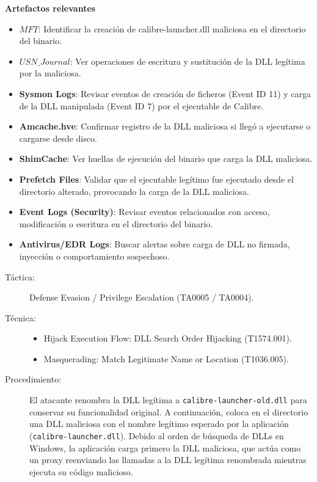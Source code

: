 \textbf{Artefactos relevantes}
\begin{itemize}
    \item \textbf{$MFT$}: Identificar la creación de calibre-launcher.dll maliciosa en el directorio del binario.
    \item \textbf{$USN\_Journal$}: Ver operaciones de escritura y sustitución de la DLL legítima por la maliciosa.
    \item \textbf{Sysmon Logs}: Revisar eventos de creación de ficheros (Event ID 11) y carga de la DLL manipulada (Event ID 7) por el ejecutable de Calibre.
    \item \textbf{Amcache.hve}: Confirmar registro de la DLL maliciosa si llegó a ejecutarse o cargarse desde disco.
    \item \textbf{ShimCache}: Ver huellas de ejecución del binario que carga la DLL maliciosa.
    \item \textbf{Prefetch Files}: Validar que el ejecutable legítimo fue ejecutado desde el directorio alterado, provocando la carga de la DLL maliciosa.
    \item \textbf{Event Logs (Security)}: Revisar eventos relacionados con acceso, modificación o escritura en el directorio del binario.
    \item \textbf{Antivirus/EDR Logs}: Buscar alertas sobre carga de DLL no firmada, inyección o comportamiento sospechoso.
\end{itemize}

\begin{leftbar}
    \begin{description}
        \item[Táctica:] Defense Evasion / Privilege Escalation (TA0005 / TA0004).
        \item[Técnica:] 
        \begin{itemize} 
            \item Hijack Execution Flow: DLL Search Order Hijacking (T1574.001).
            \item Masquerading: Match Legitimate Name or Location (T1036.005).
        \end{itemize} 
        \item[Procedimiento:]  
        El atacante renombra la DLL legítima a \texttt{calibre-launcher-old.dll} para conservar su funcionalidad original. A continuación, coloca en el directorio una DLL maliciosa con el nombre legítimo esperado por la aplicación (\texttt{calibre-launcher.dll}). Debido al orden de búsqueda de DLLs en Windows, la aplicación carga primero la DLL maliciosa, que actúa como un proxy reenviando las llamadas a la DLL legítima renombrada mientras ejecuta su código malicioso.
    \end{description}
\end{leftbar}

